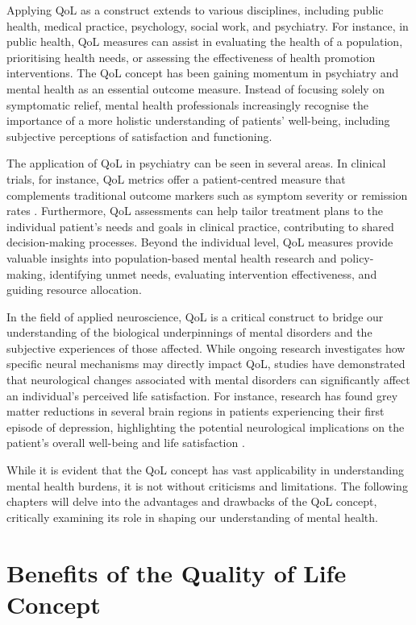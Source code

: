 \documentclass[10pt]{article}
\begin{document}
\begin{sloppypar}
  Applying QoL as a construct extends to various disciplines, including public health, medical practice, psychology, social work, and psychiatry. For instance, in public health, QoL measures can assist in evaluating the health of a population, prioritising health needs, or assessing the effectiveness of health promotion interventions. The QoL concept has been gaining momentum in psychiatry and mental health as an essential outcome measure. Instead of focusing solely on symptomatic relief, mental health professionals increasingly recognise the importance of a more holistic understanding of patients' well-being, including subjective perceptions of satisfaction and functioning.

  The application of QoL in psychiatry can be seen in several areas. In clinical trials, for instance, QoL metrics offer a patient-centred measure that complements traditional outcome markers such as symptom severity or remission rates \citep{malla_first-episode_2005}. Furthermore, QoL assessments can help tailor treatment plans to the individual patient's needs and goals in clinical practice, contributing to shared decision-making processes. Beyond the individual level, QoL measures provide valuable insights into population-based mental health research and policy-making, identifying unmet needs, evaluating intervention effectiveness, and guiding resource allocation.

  In the field of applied neuroscience, QoL is a critical construct to bridge our understanding of the biological underpinnings of mental disorders and the subjective experiences of those affected. While ongoing research investigates how specific neural mechanisms may directly impact QoL, studies have demonstrated that neurological changes associated with mental disorders can significantly affect an individual's perceived life satisfaction. For instance, research has found grey matter reductions in several brain regions in patients experiencing their first episode of depression, highlighting the potential neurological implications on the patient's overall well-being and life satisfaction \citep{zhang_brain_2016}.

  While it is evident that the QoL concept has vast applicability in understanding mental health burdens, it is not without criticisms and limitations. The following chapters will delve into the advantages and drawbacks of the QoL concept, critically examining its role in shaping our understanding of mental health.

  \section{Benefits of the Quality of Life Concept}
  \label{sec:benefits}


\end{sloppypar}
\end{document}
